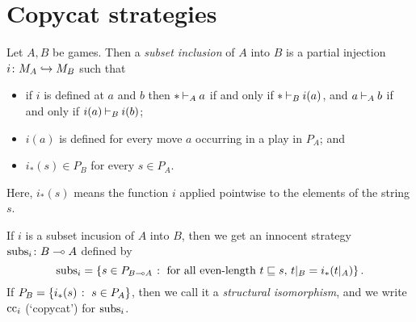 \documentclass[11pt]{report}
\begin{document}
\section{Copycat strategies}
\label{SecCopycat}

\begin{definition}
  Let $A,B$ be games.  
  Then a \emph{subset inclusion} of $A$ into $B$ is a partial injection $i\colon M_A\hookrightarrow M_B$ such that
  \begin{itemize}
    \item if $i$ is defined at $a$ and $b$ then $*\mathbin{\vdash}_A a$ if and only if $*\mathbin{\vdash}_B i(a)$, and $a\mathbin{\vdash}_A b$ if and only if $i(a)\mathbin{\vdash}_B i(b)$;
    \item $i(a)$ is defined for every move $a$ occurring in a play in $P_A$; and
    \item $i_*(s)\in P_B$ for every $s\in P_A$.
  \end{itemize}
  Here, $i_*(s)$ means the function $i$ applied pointwise to the elements of the string $s$.

  If $i$ is a subset incusion of $A$ into $B$, then we get an innocent strategy $\operatorname{subs}_i\colon B \multimap A$ defined by
  \[
    \operatorname{subs}_i = \{s\in P_{B\multimap A}\;\colon\;\text{for all even-length $t\sqsubseteq s$, $t\vert_B=i_*(t\vert_A)$}\}\,.
    \]
  If $P_B=\{i_*(s)\;\colon\; s\in P_A\}$, then we call it a \emph{structural isomorphism}, and we write $\operatorname{cc}_i$ (`copycat') for $\operatorname{subs}_i$.
\end{definition}
\end{document}
